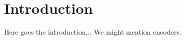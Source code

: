 
\chapter[introduction]{Introduction}\label{chp:introduction}


Here goes the introduction... We might mention \glspl{encoder}.




